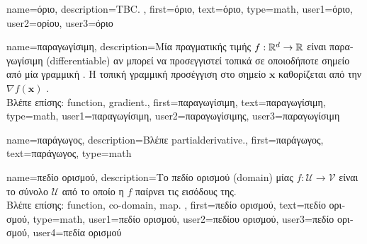 {name={\foreignlanguage{greek}{όριο}},
	description={TBC. },
	first={\foreignlanguage{greek}{όριο}}, 
	text={\foreignlanguage{greek}{όριο}},
	type=math,
	user1={\foreignlanguage{greek}{όριο}}, %
  	user2={\foreignlanguage{greek}{ορίου}}, %
	user3={\foreignlanguage{greek}{όριο}} %
}

{name={\foreignlanguage{greek}{παραγωγίσιμη}},
	description={\foreignlanguage{greek}{Μία}  \foreignlanguage{greek}{πραγματικής 
		τιμής} $f: \mathbb{R}^{d} \rightarrow \mathbb{R}$ 
		\foreignlanguage{greek}{είναι παραγωγίσιμη} (differentiable) \foreignlanguage{greek}{αν μπορεί να προσεγγιστεί τοπικά σε οποιοδήποτε 
		σημείο από μία γραμμική} . \foreignlanguage{greek}{Η τοπική γραμμική προσέγγιση στο σημείο $\mathbf{x}$ 
		καθορίζεται από την}  $\nabla f ( \mathbf{x})$ \cite{RudinBookPrinciplesMatheAnalysis}.
		\\
		\foreignlanguage{greek}{Βλέπε επίσης:} \gls{function}, \gls{gradient}.},
	first={\foreignlanguage{greek}{παραγωγίσιμη}},
	text={\foreignlanguage{greek}{παραγωγίσιμη}},
	type=math,
	user1={\foreignlanguage{greek}{παραγωγίσιμη}}, %
  	user2={\foreignlanguage{greek}{παραγωγίσιμης}}, %
	user3={\foreignlanguage{greek}{παραγωγίσιμη}} %
}

{name={\foreignlanguage{greek}{παράγωγος}}, 
	description={\foreignlanguage{greek}{Βλέπε} \gls{partialderivative}.}, 
 	first={\foreignlanguage{greek}{παράγωγος}}, 
 	text={\foreignlanguage{greek}{παράγωγος}}, 
 	type=math
}

{name={\foreignlanguage{greek}{πεδίο ορισμού}}, 
	description={\foreignlanguage{greek}{Το πεδίο ορισμού} (domain) 
		\foreignlanguage{greek}{μίας}  $f: \mathcal{U} \rightarrow \mathcal{V}$ \foreignlanguage{greek}{είναι 
		το σύνολο $\mathcal{U}$ από το οποίο η $f$ παίρνει τις εισόδους της}.  
		\\
		\foreignlanguage{greek}{Βλέπε επίσης:} \gls{function}, \gls{co-domain}, \gls{map}. },
	first={\foreignlanguage{greek}{πεδίο ορισμού}},
	text={\foreignlanguage{greek}{πεδίο ορισμού}},
	type=math,
	user1={\foreignlanguage{greek}{πεδίο ορισμού}}, %
  	user2={\foreignlanguage{greek}{πεδίου ορισμού}}, %
	user3={\foreignlanguage{greek}{πεδίο ορισμού}}, %
	user4={\foreignlanguage{greek}{πεδία ορισμού}} %
}

